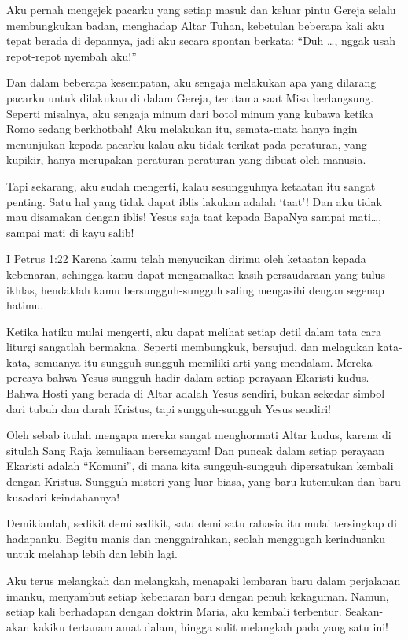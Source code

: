 Aku pernah mengejek pacarku yang setiap masuk dan keluar pintu Gereja selalu membungkukan badan, menghadap Altar Tuhan, kebetulan beberapa kali aku tepat berada di depannya, jadi aku secara spontan berkata: “Duh \ldots , nggak usah repot-repot nyembah aku!”

Dan dalam beberapa kesempatan, aku sengaja melakukan apa yang dilarang pacarku untuk dilakukan di dalam Gereja, terutama saat Misa berlangsung. Seperti misalnya, aku sengaja minum dari botol minum yang kubawa ketika Romo sedang berkhotbah! Aku melakukan itu, semata-mata hanya ingin menunjukan kepada pacarku kalau aku tidak terikat pada peraturan, yang kupikir, hanya merupakan peraturan-peraturan yang dibuat oleh manusia.

Tapi sekarang, aku sudah mengerti, kalau sesungguhnya ketaatan itu sangat penting. Satu hal yang tidak dapat iblis lakukan adalah ‘taat’!
Dan aku tidak mau disamakan dengan iblis! Yesus saja taat kepada BapaNya sampai mati…, sampai mati di kayu salib!

I Petrus 1:22 Karena kamu telah menyucikan dirimu oleh ketaatan kepada kebenaran, sehingga kamu dapat mengamalkan kasih persaudaraan yang tulus ikhlas, hendaklah kamu bersungguh-sungguh saling mengasihi dengan segenap hatimu.

Ketika hatiku mulai mengerti, aku dapat melihat setiap detil dalam tata cara liturgi sangatlah bermakna. Seperti membungkuk, bersujud, dan melagukan kata-kata, semuanya itu sungguh-sungguh memiliki arti yang mendalam. Mereka percaya bahwa Yesus sungguh hadir dalam setiap perayaan Ekaristi kudus. Bahwa Hosti yang berada di Altar adalah Yesus sendiri, bukan sekedar simbol dari tubuh dan darah Kristus, tapi sungguh-sungguh Yesus sendiri!

Oleh sebab itulah mengapa mereka sangat menghormati Altar kudus, karena di situlah Sang Raja kemuliaan bersemayam! Dan puncak dalam setiap perayaan Ekaristi adalah “Komuni”, di mana kita sungguh-sungguh dipersatukan kembali dengan Kristus. Sungguh misteri yang luar biasa, yang baru kutemukan dan baru kusadari keindahannya!

Demikianlah, sedikit demi sedikit, satu demi satu rahasia itu mulai tersingkap di hadapanku. Begitu manis dan menggairahkan, seolah menggugah kerinduanku untuk melahap lebih dan lebih lagi.

Aku terus melangkah dan melangkah, menapaki lembaran baru dalam perjalanan imanku, menyambut setiap kebenaran baru dengan penuh kekaguman. Namun, setiap kali berhadapan dengan doktrin Maria, aku kembali terbentur. Seakan-akan kakiku tertanam amat dalam, hingga sulit melangkah pada yang satu ini!

